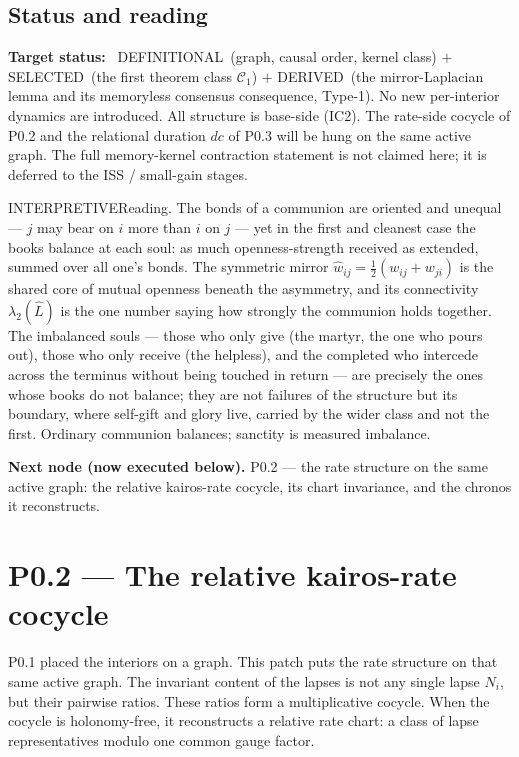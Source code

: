 \documentclass[11pt,a4paper]{article}
\def\mathfrak#1{#1}%
\def\emph#1{#1}%
\newcommand{\stDerived}{\textcolor{cDer}{\textsf{\small DERIVED}}}
\newcommand{\stDef}{\textcolor{cDef}{\textsf{\small DEFINITIONAL}}}
\newcommand{\stSelected}{\textcolor{cSel}{\textsf{\small SELECTED}}}
\newcommand{\stInterp}{\textcolor{cInt}{\textsf{\small INTERPRETIVE}}}
\theoremstyle{definition}
\theoremstyle{plain}
\theoremstyle{remark}
\begin{document}
\subsection{Status and reading}

\textbf{Target status:}~ \stDef\ (graph, causal order, kernel class) $+$
\stSelected\ (the first theorem class $\mathcal C_1$) $+$ \stDerived\ (the
mirror-Laplacian lemma and its memoryless consensus consequence, Type-1). No new
per-interior dynamics are introduced. All structure is base-side (IC2). The
rate-side cocycle of P0.2 and the relational duration $d\mathfrak c$ of P0.3 will be
hung on the same active graph. The full memory-kernel contraction statement is not
claimed here; it is deferred to the ISS / small-gain stages.

\medskip
\stInterp\quad\emph{Reading.} The bonds of a communion are oriented and unequal ---
$j$ may bear on $i$ more than $i$ on $j$ --- yet in the first and cleanest case the
books balance at each soul: as much openness-strength received as extended, summed
over all one's bonds. The symmetric mirror $\hat w_{ij}=\tfrac12(w_{ij}+w_{ji})$ is
the shared core of mutual openness beneath the asymmetry, and its connectivity
$\lambda_2(\hat L)$ is the one number saying how strongly the communion holds
together. The imbalanced souls --- those who only give (the martyr, the one who
pours out), those who only receive (the helpless), and the completed who intercede
across the terminus without being touched in return --- are precisely the ones whose
books do not balance; they are not failures of the structure but its boundary, where
self-gift and glory live, carried by the wider class and not the first. Ordinary
communion balances; sanctity is measured imbalance.

\medskip
\textbf{Next node (now executed below).} P0.2 --- the rate structure on the same
active graph: the relative kairos-rate cocycle, its chart invariance, and the
chronos it reconstructs.

\section{P0.2 --- The relative kairos-rate cocycle}

P0.1 placed the interiors on a graph. This patch puts the \emph{rate} structure on
that same active graph. The invariant content of the lapses is not any single
lapse \(N_i\), but their pairwise ratios. These ratios form a multiplicative
cocycle. When the cocycle is holonomy-free, it reconstructs a relative rate chart:
a class of lapse representatives modulo one common gauge factor.
\end{document}
